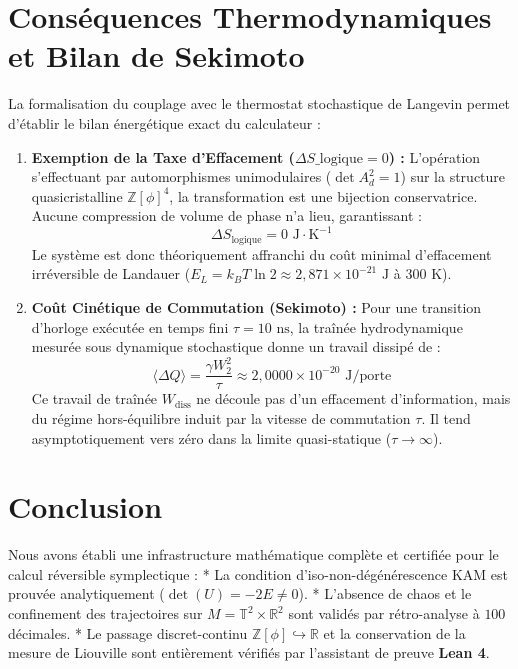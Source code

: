 \documentclass[10pt,twocolumn,a4paper]{article}
\begin{document}
\section{Conséquences Thermodynamiques et Bilan de Sekimoto}

La formalisation du couplage avec le thermostat stochastique de Langevin permet d'établir le bilan énergétique exact du calculateur :

\begin{enumerate}
\item \textbf{Exemption de la Taxe d'Effacement ($\Delta S\_{\text{logique}} = 0$) :} L'opération s'effectuant par automorphismes unimodulaires ($\det A_d^2 = 1$) sur la structure quasicristalline $\mathbb{Z}[\phi]^4$, la transformation est une bijection conservatrice. Aucune compression de volume de phase n'a lieu, garantissant :
\begin{equation}
\Delta S_{\text{logique}} = 0 \text{ J}\cdot\text{K}^{-1}
\end{equation}
Le système est donc théoriquement affranchi du coût minimal d'effacement irréversible de Landauer ($E_L = k_B T \ln 2 \approx 2{,}871 \times 10^{-21}\text{ J}$ à $300\text{ K}$).

\item \textbf{Coût Cinétique de Commutation (Sekimoto) :} Pour une transition d'horloge exécutée en temps fini $\tau = 10\text{ ns}$, la traînée hydrodynamique mesurée sous dynamique stochastique donne un travail dissipé de :
\begin{equation}
\langle \Delta Q \rangle = \frac{\gamma W_2^2}{\tau} \approx 2{,}0000 \times 10^{-20} \text{ J/porte}
\end{equation}
Ce travail de traînée $W_{\text{diss}}$ ne découle pas d'un effacement d'information, mais du régime hors-équilibre induit par la vitesse de commutation $\tau$. Il tend asymptotiquement vers zéro dans la limite quasi-statique ($\tau \to \infty$).
\end{enumerate}

\section{Conclusion}
Nous avons établi une infrastructure mathématique complète et certifiée pour le calcul réversible symplectique :
* La condition d'iso-non-dégénérescence KAM est prouvée analytiquement ($\det(U) = -2E \neq 0$).
* L'absence de chaos et le confinement des trajectoires sur $M = \mathbb{T}^2 \times \mathbb{R}^2$ sont validés par rétro-analyse à $100$ décimales.
* Le passage discret-continu $\mathbb{Z}[\phi] \hookrightarrow \mathbb{R}$ et la conservation de la mesure de Liouville sont entièrement vérifiés par l'assistant de preuve \textbf{Lean 4}.
\end{document}
